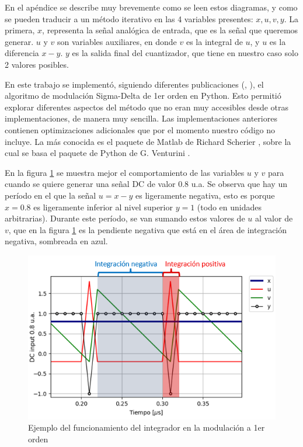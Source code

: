 \documentclass[twoside]{article}
\begin{document}
\begin{multicols}{2}
En el apéndice se describe muy brevemente como se leen estos diagramas, y como se pueden traducir a un método iterativo en las 4 variables presentes: $x,u,v,y$.
La primera, $x$, representa la señal analógica de entrada, que es la señal que queremos generar. $u$ y $v$ son variables auxiliares, en donde $v$ es la integral de $u$, y $u$ es la diferencia $x-y$. $y$ es la salida final del cuantizador, que tiene en nuestro caso solo 2 valores posibles.


En este trabajo se implementó, siguiendo diferentes publicaciones (\cite{delarosa2011}, \cite{aziz1996}), el algoritmo de modulación Sigma-Delta de 1er orden en Python. Esto permitió explorar diferentes aspectos del método que no eran muy accesibles desde otras implementaciones, de manera muy sencilla.
Las implementaciones anteriores contienen optimizaciones adicionales que por el momento nuestro código no incluye. La más conocida es el paquete de Matlab de Richard Scherier \cite{DSmatlab}, sobre la cual se basa el paquete de Python de G. Venturini \cite{DSpython}. %

En la figura \ref{fig:integrador} se muestra mejor el comportamiento de las variables $u$ y $v$ para cuando se quiere generar una señal DC de valor 0.8 u.a. Se observa que hay un período en el que la señal $u=x-y$ es ligeramente negativa, esto es porque $x=0.8$ es ligeramente inferior al nivel superior $y=1$ (todo en unidades arbitrarias). Durante este período, se van sumando estos valores de $u$ al valor de $v$, que en la figura \ref{fig:integrador} es la pendiente negativa que está en el área de integración negativa, sombreada en azul.


\begin{figure}[H]
\centering
\includegraphics[width=\linewidth]{figuras/integracion.png}
\caption{Ejemplo del funcionamiento del integrador en la modulación a 1er orden}
\label{fig:integrador}
\end{figure}


\end{multicols}
\end{document}
